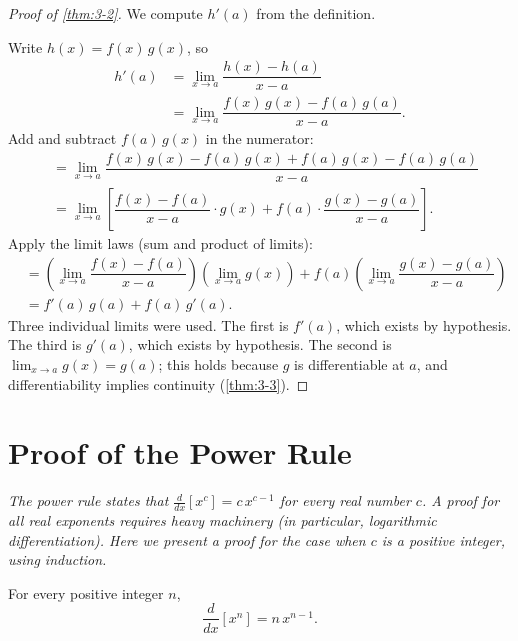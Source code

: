\begin{proof}[Proof of \cref{thm:3-2}]
We compute $h'(a)$ from the definition.

Write $h(x) = f(x)\,g(x)$, so
\begin{align*}
  h'(a)
  &= \lim_{x \to a} \dfrac{h(x) - h(a)}{x - a} \\
  &= \lim_{x \to a} \dfrac{f(x)\,g(x) - f(a)\,g(a)}{x - a}.
\end{align*}
Add and subtract $f(a)\,g(x)$ in the numerator:
\begin{align*}
  &= \lim_{x \to a} \dfrac{f(x)\,g(x) - f(a)\,g(x) + f(a)\,g(x) - f(a)\,g(a)}{x - a} \\
  &= \lim_{x \to a} \left[\dfrac{f(x) - f(a)}{x - a}\cdot g(x) + f(a) \cdot \dfrac{g(x) - g(a)}{x - a}\right].
\end{align*}
Apply the limit laws (sum and product of limits):
\begin{align*}
  &= \left(\lim_{x \to a} \dfrac{f(x)-f(a)}{x-a}\right)\!\left(\lim_{x \to a} g(x)\right) + f(a)\!\left(\lim_{x \to a}\dfrac{g(x)-g(a)}{x-a}\right) \\
  &= f'(a)\,g(a) + f(a)\,g'(a).
\end{align*}
Three individual limits were used.  The first is $f'(a)$, which exists by hypothesis.  The third is $g'(a)$, which exists by hypothesis.  The second is $\lim_{x \to a} g(x) = g(a)$; this holds because $g$ is differentiable at $a$, and differentiability implies continuity (\cref{thm:3-3}).
\end{proof}

\section{Proof of the Power Rule}
\label{sec:3.7}

\textit{The power rule states that $\frac{d}{dx}[x^{c}] = c\,x^{c-1}$ for every real number $c$.  A proof for all real exponents requires heavy machinery (in particular, logarithmic differentiation).  Here we present a proof for the case when $c$ is a positive integer, using induction.}

\begin{theorem}
\label{thm:3-4}
For every positive integer $n$,
\[
  \dfrac{d}{dx}\!\left[x^{n}\right] = n\,x^{n-1}.
\]
\end{theorem}

